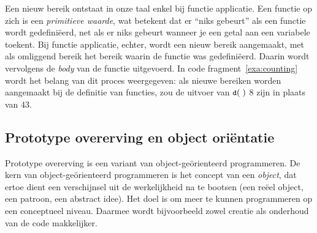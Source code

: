 
Een nieuw bereik ontstaat in onze taal enkel bij functie applicatie. Een functie op zich is een \emph{primitieve waarde}, wat betekent dat er ``niks gebeurt'' als een functie wordt gedefiniëerd, net als er niks gebeurt wanneer je een getal aan een variabele toekent. Bij functie applicatie, echter, wordt een nieuw bereik aangemaakt, met als omliggend bereik het bereik waarin de functie was gedefiniëerd. Daarin wordt vervolgens de \emph{body} van de functie uitgevoerd. In code fragment~\ref{exa:counting} wordt het belang van dit proces weergegeven: als nieuwe bereiken worden aangemaakt bij de definitie van functies, zou de uitvoer van $\text{\ttfamily\small\upshape d}(\;)$ 8 zijn in plaats van 43.

\begin{NoBreak}
\codeFragmentCaption
{}
\end{NoBreak}

\subsection{Prototype overerving en object oriëntatie}
\label{sec:taal-prototypen}

Prototype overerving is een variant van object-geörienteerd programmeren. De kern van object-geörienteerd programmeren is het concept van een \emph{object}, dat ertoe dient een verschijnsel uit de werkelijkheid na te bootsen (een reëel object, een patroon, een abstract idee). Het doel is om meer te kunnen programmeren op een conceptueel niveau. Daarmee wordt bijvoorbeeld zowel creatie als onderhoud van de code makkelijker.

